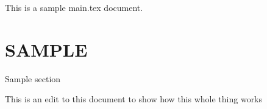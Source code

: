 \documentclass{article}
\begin{document}
This is a sample main.tex document.

\section{SAMPLE}
Sample section

This is an edit to this document to show how this whole thing works
\end{document}
